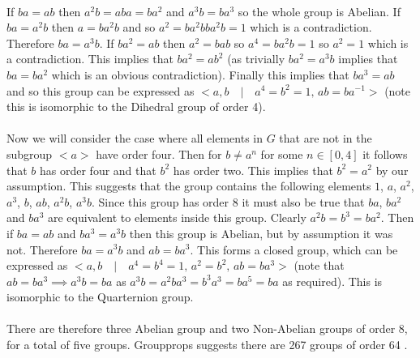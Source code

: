 \documentclass{article}
\begin{document}
\paragraph{}
If $ba = ab$ then $a^2b = aba = ba^2$ and $a^3b = ba^3$ so the whole 
group is Abelian. If $ba = a^2b$ then $a = ba^2b$ and so $a^2 = ba^2bba^2b = 1$ which is a 
contradiction. Therefore $ba = a^3b$. If $ba^2 = ab$ then $a^2 = bab$ so $a^4 = ba^2b = 1$ 
so $a^2 = 1$ which is a contradiction. This implies that $ba^2 = ab^2$ (as trivially $ba^2 = a^3b$ 
implies that $ba = ba^2$ which is an obvious contradiction). Finally this implies that $ba^3 = ab$ 
and so this group can be expressed as $< a,b \quad | \quad  a^4 = b^2 = 1, \, ab = ba^{-1} >$ 
(note this is isomorphic to the Dihedral group of order 4).

\paragraph{}
Now we will consider the case where all elements in $G$ that are not in the subgroup 
$<a>$ have order four. Then for $b \neq a^n$ for some $n \in [0,4]$ it follows that $b$ has order 
four and that $b^2$ has order two. This implies that $b^2 = a^2$ by our assumption. This suggests 
that the group contains the following elements $1$, $a$, $a^2$, $a^3$, $b$, $ab$, $a^2b$, $a^3b$. 
Since this group has order 8 it must also be true that $ba$, $ba^2$ and $ba^3$ are equivalent 
to elements inside this group. Clearly $a^2b = b^3 = ba^2$. Then if $ba = ab$ and $ba^3 = a^3b$ then 
this group is Abelian, but by assumption it was not. Therefore $ba = a^3b$ and $ab = ba^3$. 
This forms a closed group, which can be expressed as $< a,b \quad | \quad a^4 = b^4 = 1,\, a^2 = b^2,\, ab = ba^3 >$ 
(note that $ab = ba^3 \implies a^3b = ba$ as $a^3b = a^2ba^3 = b^3a^3 = ba^5 = ba$ as required). 
This is isomorphic to the Quarternion group. 

\paragraph{}
There are therefore three Abelian group and two Non-Abelian groups of order 8, for a total of 
five groups. Groupprops suggests there are 267 groups of order 64 \cite{Groupprops}.

\printbibliography
\end{document}
